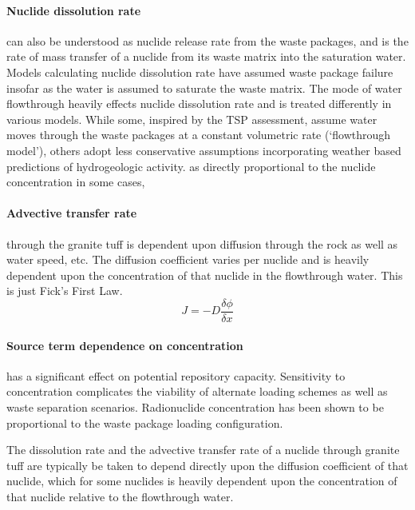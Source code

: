 

\paragraph{Nuclide dissolution rate} can also be understood as nuclide 
release rate from the waste packages, and is the rate of mass transfer 
of a nuclide from its waste matrix into the saturation water. Models 
calculating  nuclide dissolution rate have assumed waste package 
failure insofar as the water is assumed to saturate the waste matrix. 
The mode of water flowthrough heavily effects nuclide dissolution rate 
and is treated differently in various models. While some, inspired by 
the TSP assessment, assume water moves through the waste packages at a 
constant volumetric rate (`flowthrough model'), others adopt less 
conservative assumptions incorporating weather based predictions of 
hydrogeologic activity. as directly proportional to the nuclide 
concentration in some cases,  \paragraph{Advective transfer rate} 
through the granite tuff is dependent upon diffusion through the rock 
as well as water speed, etc. The diffusion coefficient varies per 
nuclide and is heavily dependent upon the concentration of that 
nuclide in the flowthrough water. This is just Fick's First Law.  
\begin{equation}
J = -D\frac{\delta\phi}{\delta x}
\end{equation}

\paragraph{Source term dependence on concentration} has a significant 
effect on potential repository capacity. Sensitivity to concentration 
complicates the viability of alternate loading schemes as well as 
waste separation scenarios. Radionuclide concentration has been shown 
to be proportional to the waste package loading 
configuration.\cite{ahn_relationship_2002,kawasaki_congruent_2004}

The dissolution rate and the advective transfer rate of a nuclide 
through granite tuff are typically be taken to depend directly upon 
the diffusion coefficient of that nuclide, which for some nuclides is 
heavily dependent upon the concentration of that nuclide relative to 
the flowthrough water. 

